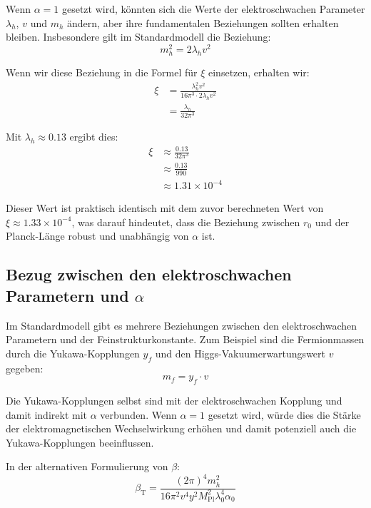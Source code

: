 \documentclass[12pt,a4paper]{article}
\newcommand{\betaT}{\beta_{\text{T}}}
\newcommand{\Mpl}{M_{\text{Pl}}}
\begin{document}
	Wenn $\alpha = 1$ gesetzt wird, könnten sich die Werte der elektroschwachen Parameter $\lambda_h$, $v$ und $m_h$ ändern, aber ihre fundamentalen Beziehungen sollten erhalten bleiben. Insbesondere gilt im Standardmodell die Beziehung:
	\begin{equation}
		m_h^2 = 2\lambda_h v^2
	\end{equation}
	
	Wenn wir diese Beziehung in die Formel für $\xi$ einsetzen, erhalten wir:
	\begin{align}
		\xi &= \frac{\lambda_h^2 v^2}{16\pi^3 \cdot 2\lambda_h v^2} \\
		&= \frac{\lambda_h}{32\pi^3}
	\end{align}
	
	Mit $\lambda_h \approx 0.13$ ergibt dies:
	\begin{align}
		\xi &\approx \frac{0.13}{32\pi^3} \\
		&\approx \frac{0.13}{990} \\
		&\approx 1.31 \times 10^{-4}
	\end{align}
	
	Dieser Wert ist praktisch identisch mit dem zuvor berechneten Wert von $\xi \approx 1.33 \times 10^{-4}$, was darauf hindeutet, dass die Beziehung zwischen $r_0$ und der Planck-Länge robust und unabhängig von $\alpha$ ist.
	
	\subsection{Bezug zwischen den elektroschwachen Parametern und $\alpha$}
	
	Im Standardmodell gibt es mehrere Beziehungen zwischen den elektroschwachen Parametern und der Feinstrukturkonstante. Zum Beispiel sind die Fermionmassen durch die Yukawa-Kopplungen $y_f$ und den Higgs-Vakuumerwartungswert $v$ gegeben:
	\begin{equation}
		m_f = y_f \cdot v
	\end{equation}
	
	Die Yukawa-Kopplungen selbst sind mit der elektroschwachen Kopplung und damit indirekt mit $\alpha$ verbunden. Wenn $\alpha = 1$ gesetzt wird, würde dies die Stärke der elektromagnetischen Wechselwirkung erhöhen und damit potenziell auch die Yukawa-Kopplungen beeinflussen.
	
	In der alternativen Formulierung von $\beta$:
	\begin{equation}
		\betaT = \frac{(2\pi)^4 m_h^2}{16 \pi^2 v^4 y^2 \Mpl^2 \lambda_0^4 \alpha_0}
	\end{equation}
	
\end{document}
